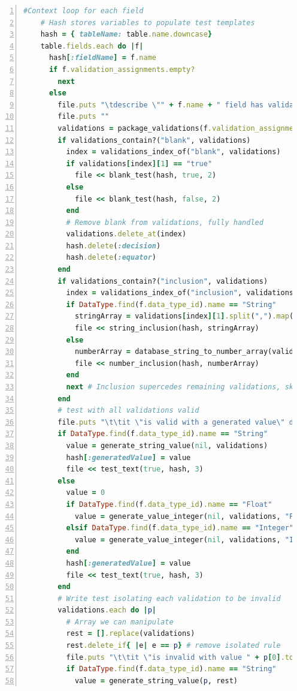 \documentclass[a4paper,12pt]{article}
\begin{document}
\begin{lstlisting}[frame=single,numbers=left,language = ruby,caption= {generate\_tests\_for\_table}, label={code:bigboy}]
    #Context loop for each field
    # Hash stores variables to populate test templates
    hash = { tableName: table.name.downcase}
    table.fields.each do |f|
      hash[:fieldName] = f.name
      if f.validation_assignments.empty?
        next 
      else
        file.puts "\tdescribe \"" + f.name + " field has validation\" do"
        file.puts ""
        validations = package_validations(f.validation_assignments)
        if validations_contain?("blank", validations)
          index = validations_index_of("blank", validations)
          if validations[index][1] == "true"
            file << blank_test(hash, true, 2)
          else
            file << blank_test(hash, false, 2)
          end
          # Remove blank from validations, fully handled
          validations.delete_at(index)
          hash.delete(:decision)
          hash.delete(:equator)
        end
        if validations_contain?("inclusion", validations)
          index = validations_index_of("inclusion", validations)
          if DataType.find(f.data_type_id).name == "String"
            stringArray = validations[index][1].split(",").map(&:strip)
            file << string_inclusion(hash, stringArray)
          else
            numberArray = database_string_to_number_array(validations[index][1])
            file << number_inclusion(hash, numberArray)
          end
          next # Inclusion supercedes remaining validations, skip to next
        end
        # test with all validations valid
        file.puts "\t\tit \"is valid with a generated value\" do\n"
        if DataType.find(f.data_type_id).name == "String"          
          value = generate_string_value(nil, validations)
          hash[:generatedValue] = value
          file << test_text(true, hash, 3)
        else
          value = 0
          if DataType.find(f.data_type_id).name == "Float"
            value = generate_value_integer(nil, validations, "Float")
          elsif DataType.find(f.data_type_id).name == "Integer"
            value = generate_value_integer(nil, validations, "Integer")
          end
          hash[:generatedValue] = value
          file << test_text(true, hash, 3)
        end
        # Write test isolating each validation to be invalid
        validations.each do |p|
          # Array we can manipulate
          rest = [].replace(validations)
          rest.delete_if{ |e| e == p} # remove isolated rule
          file.puts "\t\tit \"is invalid with value " + p[0].to_s + " " + p[1].to_s + "\" do"
          if DataType.find(f.data_type_id).name == "String"
            value = generate_string_value(p, rest)

\end{lstlisting}
\end{document}
